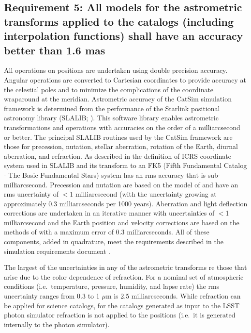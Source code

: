 \documentclass[]{article}
\begin{document}
{\subsection{Requirement 5: All models for the astrometric transforms applied to the catalogs (including interpolation functions) 
shall have an accuracy better than 1.6 mas}
All operations on positions are undertaken using double precision accuracy. Angular operations are converted to Cartesian coordinates to provide accuracy at the celestial poles and to minimize the complications of the coordinate wraparound at the meridian. Astrometric accuracy of the CatSim simulation framework is determined from the performance of the Starlink positional astronomy library (SLALIB; \citet{wallace}). This software library enables astrometric transformations and operations with
accuracies on the order of a milliarcsecond or better.  The principal SLALIB routines used by the CatSim framework are those for precession, nutation, stellar aberration, rotation of the Earth, diurnal aberration, and refraction.  As described in \citet{wallace} the definition of ICRS coordinate system used in SLALIB and its transform to an FK5 (Fifth Fundamental Catalog - The Basic Fundamental Stars) system has an rms accuracy that is sub-milliarcsecond. Precession and nutation are based on the
model of \citet{SF2001} and have an rms uncertainty of $<$1 milliarcsecond (with the uncertainty growing at approximately 0.3 milliarcseconds per 1000 years). Aberration and light deflection corrections are undertaken in an iterative manner with uncertainties of $<$1 milliarcsecond and the Earth position and velocity corrections are based on the methods of \citep{stumpff} with a maximum error of 0.3 milliarcseconds. All of these components, added in quadrature, meet the requirements described
in the simulation requirements document \citet{requirements}.

The largest of the uncertainties in any of the astrometric transforms  re those that arise due to the color dependence of refraction. For a nominal set of atmospheric conditions (i.e.\ temperature, pressure, humidity, and lapse rate) the rms uncertainty ranges from 0.3 to 1 $\mu$m is 2.5 milliarcseconds. While refraction can be applied for science catalogs, for the catalogs generated as input to the LSST photon simulator refraction is not applied to the positions (i.e.\ it is generated internally to the photon
simulator).
}
\end{document}
